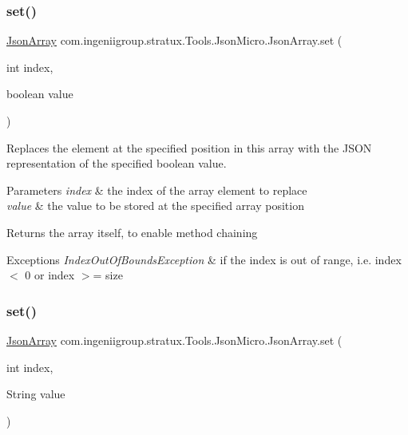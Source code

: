 \subsubsection{\texorpdfstring{set()}{set()}\hspace{0.1cm}{\footnotesize\ttfamily [5/7]}}
{\footnotesize\ttfamily \hyperlink{classcom_1_1ingeniigroup_1_1stratux_1_1_tools_1_1_json_micro_1_1_json_array}{Json\+Array} com.\+ingeniigroup.\+stratux.\+Tools.\+Json\+Micro.\+Json\+Array.\+set (\begin{DoxyParamCaption}\item[{int}]{index,  }\item[{boolean}]{value }\end{DoxyParamCaption})}

Replaces the element at the specified position in this array with the J\+S\+ON representation of the specified {\ttfamily boolean} value.


\begin{DoxyParams}{Parameters}
{\em index} & the index of the array element to replace \\
\hline
{\em value} & the value to be stored at the specified array position \\
\hline
\end{DoxyParams}
\begin{DoxyReturn}{Returns}
the array itself, to enable method chaining 
\end{DoxyReturn}

\begin{DoxyExceptions}{Exceptions}
{\em Index\+Out\+Of\+Bounds\+Exception} & if the index is out of range, i.\+e. {\ttfamily index $<$ 0} or {\ttfamily index $>$= size} \\
\hline
\end{DoxyExceptions}
\mbox{\label{classcom_1_1ingeniigroup_1_1stratux_1_1_tools_1_1_json_micro_1_1_json_array_aad603a2b5df5b9a78ab4cb5a75854ae8}} 
\subsubsection{\texorpdfstring{set()}{set()}\hspace{0.1cm}{\footnotesize\ttfamily [6/7]}}
{\footnotesize\ttfamily \hyperlink{classcom_1_1ingeniigroup_1_1stratux_1_1_tools_1_1_json_micro_1_1_json_array}{Json\+Array} com.\+ingeniigroup.\+stratux.\+Tools.\+Json\+Micro.\+Json\+Array.\+set (\begin{DoxyParamCaption}\item[{int}]{index,  }\item[{String}]{value }\end{DoxyParamCaption})}

